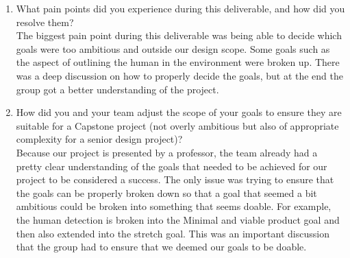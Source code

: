 \begin{enumerate}
\item What pain points did you experience during this deliverable, and how
did you resolve them?\\

The biggest pain point during this deliverable was being able to decide which goals were too ambitious and outside our design scope. Some goals such as the aspect of outlining the human 
in the environment were broken up. There was a deep discussion on how to properly decide the goals, but at the end the  group got a better understanding of the project.

\item How did you and your team adjust the scope of your goals to ensure
they are suitable for a Capstone project (not overly ambitious but also of
appropriate complexity for a senior design project)?\\

Because our project is presented by a professor, the team already had a pretty clear understanding of the goals that needed to be achieved for our project to be considered a success.
 The only issue was trying to ensure that the goals can be properly broken down so that a goal that seemed a bit ambitious could be broken into something that seems doable. For example, 
 the human detection is broken into the Minimal and viable product goal and then also extended into the stretch goal. This was an important discussion that the group had to ensure that we 
 deemed our goals to be doable.
\end{enumerate}

